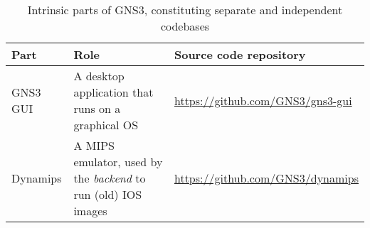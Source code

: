 \begin{table}
  \centering
  \small
  \begin{tabulary}{0.8\textwidth}{lLL}
    \toprule
      \textbf{Part}  & \textbf{Role}                                                       & \textbf{Source code repository}\\
    \midrule
      GNS3 GUI       & A desktop application that runs on a graphical OS                   & \scriptsize\url{https://github.com/GNS3/gns3-gui}\\
      Dynamips       & A MIPS emulator, used by the \emph{backend} to run (old) IOS images & \scriptsize\url{https://github.com/GNS3/dynamips}\\
    \bottomrule
  \end{tabulary}
  \caption{%
    Intrinsic parts of GNS3, constituting separate and independent codebases
  }
  \label{tab:gns3components}
\end{table}
